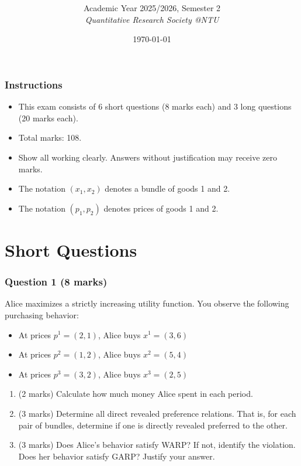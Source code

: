 \documentclass[12pt]{article}
\title{
\CourseCode \CourseName \\[0.3em]
\large \DocType
}
\author{
  Academic Year 2025/2026, Semester 2 \\[0.25em]
  \textit{Quantitative Research Society @NTU}
}
\date{\today}
\begin{document}
\maketitle
\thispagestyle{plainfirst}
\pagestyle{main}
\bigskip

\section*{Instructions}

\begin{itemize}
\item This exam consists of 6 short questions (8 marks each) and 3 long questions (20 marks each).
\item Total marks: 108.
\item Show all working clearly. Answers without justification may receive zero marks.
\item The notation $(x_1, x_2)$ denotes a bundle of goods 1 and 2.
\item The notation $(p_1, p_2)$ denotes prices of goods 1 and 2.
\end{itemize}

\bigskip

\newpage
\part{Short Questions}

\section*{Question 1 (8 marks)}

Alice maximizes a strictly increasing utility function. You observe the following purchasing behavior:
\begin{itemize}
\item At prices $p^1 = (2, 1)$, Alice buys $x^1 = (3, 6)$
\item At prices $p^2 = (1, 2)$, Alice buys $x^2 = (5, 4)$
\item At prices $p^3 = (3, 2)$, Alice buys $x^3 = (2, 5)$
\end{itemize}

\begin{enumerate}[label=(\alph*)]
\item (2 marks) Calculate how much money Alice spent in each period.
\item (3 marks) Determine all direct revealed preference relations. That is, for each pair of bundles, determine if one is directly revealed preferred to the other.
\item (3 marks) Does Alice's behavior satisfy WARP? If not, identify the violation. Does her behavior satisfy GARP? Justify your answer.
\end{enumerate}
\end{document}
